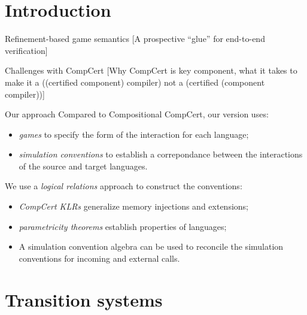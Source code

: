 \documentclass{beamer}
\begin{document}
\section{Introduction} %

\begin{frame}{Refinement-based game semantics} %
[A prospective ``glue'' for end-to-end verification]
\end{frame}

\begin{frame}{Challenges with CompCert} %
[Why CompCert is key component,
what it takes to
make it a ((certified component) compiler) not a
(certified (component compiler))]
\end{frame}

\begin{frame}{Our approach} %
Compared to Compositional CompCert,
our version uses:
\begin{itemize}
\item \emph{games} to specify
  the form of the interaction
  for each language;
\item \emph{simulation conventions} to
  establish a correpondance between the
  interactions of the source and target languages.
\end{itemize}

\vspace{1ex}
We use a \emph{logical relations} approach
to construct the conventions:
\begin{itemize}
\item \emph{CompCert KLRs} generalize memory injections and extensions;
\item \emph{parametricity theorems}
  establish properties of languages;
\item A simulation convention algebra
  can be used to reconcile the simulation conventions for
  incoming and external calls.
\end{itemize}
\end{frame}


\section{Transition systems} %
\end{document}
